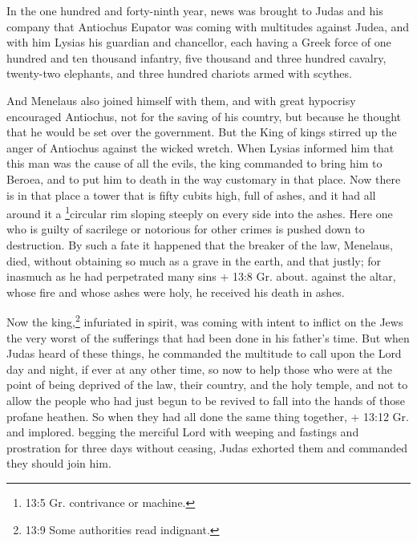  In the one hundred and forty-ninth year, news was brought
to Judas and his company that Antiochus Eupator was coming with
multitudes against Judea,  and with him Lysias his guardian
and chancellor, each having a Greek force of one hundred and ten
thousand infantry, five thousand and three hundred cavalry, twenty-two
elephants, and three hundred chariots armed with scythes.

 And Menelaus also joined himself with them, and with great
hypocrisy encouraged Antiochus, not for the saving of his country, but
because he thought that he would be set over the government.
 But the King of kings stirred up the anger of Antiochus
against the wicked wretch. When Lysias informed him that this man was
the cause of all the evils, the king commanded to bring him to Beroea,
and to put him to death in the way customary in that place. 
Now there is in that place a tower that is fifty cubits high, full of
ashes, and it had all around it a \footnote{13:5 Gr. contrivance or
  machine.}circular rim sloping steeply on every side into the ashes.
 Here one who is guilty of sacrilege or notorious for other
crimes is pushed down to destruction.  By such a fate it
happened that the breaker of the law, Menelaus, died, without obtaining
so much as a grave in the earth, and that justly;  for
inasmuch as he had perpetrated many sins + 13:8 Gr. about. against the
altar, whose fire and whose ashes were holy, he received his death in
ashes.

 Now the king,\footnote{13:9 Some authorities read
  indignant.} infuriated in spirit, was coming with intent to inflict on
the Jews the very worst of the sufferings that had been done in his
father's time.  But when Judas heard of these things, he
commanded the multitude to call upon the Lord day and night, if ever at
any other time, so now to help those who were at the point of being
deprived of the law, their country, and the holy temple, 
and not to allow the people who had just begun to be revived to fall
into the hands of those profane heathen.  So when they had
all done the same thing together, + 13:12 Gr. and implored. begging the
merciful Lord with weeping and fastings and prostration for three days
without ceasing, Judas exhorted them and commanded they should join him.

